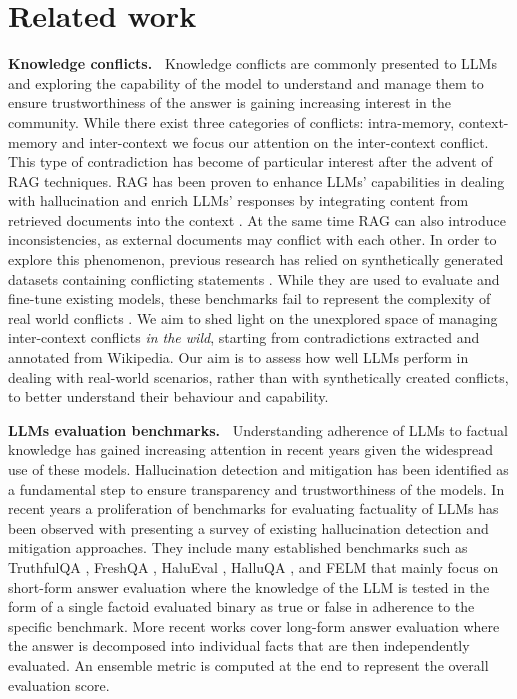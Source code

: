 \documentclass{article}
\begin{document}


\section{Related work}
\label{sec:rel}
\textbf{Knowledge conflicts.~}
Knowledge conflicts are commonly presented to LLMs and exploring the capability of the model to understand and manage them to ensure trustworthiness of the answer is gaining increasing interest in the community. While there exist three categories of conflicts: intra-memory, context-memory and inter-context \citep{xu2024knowledge} we focus our attention on the inter-context conflict. This type of contradiction has become of particular interest after the advent of RAG techniques. RAG has been proven to enhance LLMs' capabilities in dealing with hallucination and enrich LLMs' responses by integrating content from retrieved documents into the context \citep{lewis2021retrievalaugmented}. At the same time RAG can also introduce inconsistencies, as external documents may conflict with each other.
In order to explore this phenomenon, previous research has relied on synthetically generated datasets containing conflicting statements \citep{wang2023resolving, li2024contradoc}. While they are used to evaluate and fine-tune existing models, these benchmarks fail to represent the complexity of real world conflicts \citep{xu2024knowledge}. We aim to shed light on the unexplored space of managing inter-context conflicts \textit{in the wild}, starting from contradictions extracted and annotated from Wikipedia. Our aim is to assess how well LLMs perform in dealing with real-world scenarios, rather than with synthetically created conflicts, to better understand their behaviour and capability. 

\textbf{LLMs evaluation benchmarks.~}
Understanding adherence of LLMs to factual knowledge has gained increasing attention in recent years given the widespread use of these models. Hallucination detection and mitigation has been identified as a fundamental step to ensure transparency and trustworthiness of the models. In recent years a proliferation of benchmarks for evaluating factuality of LLMs has been observed with \citep{huang2023survey} presenting a survey of existing hallucination detection and mitigation approaches. They include many established benchmarks such as TruthfulQA \citep{lin2022truthfulqa}, FreshQA \citep{vu2023freshllms}, HaluEval \citep{li2023halueval}, HalluQA \citep{cheng2023evaluating}, and FELM \citep{chen2023felm} that mainly focus on short-form answer evaluation where the knowledge of the LLM is tested in the form of a single factoid evaluated binary as true or false in adherence to the specific benchmark. More recent works \citep{wei2024longform,min-etal-2023-factscore} cover long-form answer evaluation where the answer is decomposed into individual facts that are then independently evaluated. An ensemble metric is computed at the end to represent the overall evaluation score.
\end{document}
